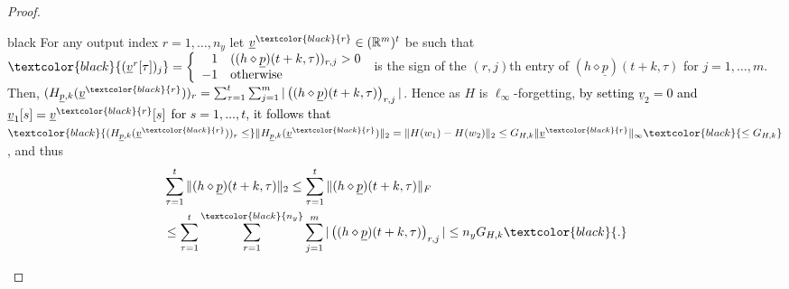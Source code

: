 \documentclass[journal,twoside,web]{ieeecolor}
\begin{document}
\begin{proof}
          \begin{color}{black}
          For any output index $r=1,\ldots,n_y$ let $\underline{v}^{\textcolor{black}{r}} \in (\mathbb{R}^m)^t$ be such that 
          $\textcolor{black}{(\underline{v}^r[\tau])_j}=\left\{\begin{array}{rl} 1 & ((h \diamond \underline{p})(t+k,\tau))_{r,j}  > 0\\ -1 & \mbox{otherwise} \end{array}\right. $ is the sign of the $(r,j)$th entry of $(h \diamond \underline{p})(t+k,\tau)$ for
          $j=1,\ldots,m$.
          Then, 
         \( (H_{\underline{p},k}(\underline{v}^{\textcolor{black}{r}}))_r=\sum_{\tau=1}^{t} \sum_{j=1}^{m} |\left((h \diamond \underline{p})(t+k,\tau)\right)_{r,j}| \).  %
           Hence 
          as $H$ is  $\ell_{\infty}$-forgetting, 
          \textcolor{black}{by setting $\underline{v}_2=0$ and $\underline{v}_1[s]=\underline{v}^{\textcolor{black}{r}}[s]$ for $s=1,\ldots,t$, it follows that} 
          $\textcolor{black}{(H_{\underline{p},k}(\underline{v}^{\textcolor{black}{r}}))_r \le} \|H_{\underline{p},k}(\underline{v}^{\textcolor{black}{r}})\|_{2}=\|H(w_1)-H(w_2)\|_2 \le G_{H,k}\|\underline{v}^{\textcolor{black}{r}}\|_{\infty} \textcolor{black}{\le G_{H,k}}$, and thus
          \begin{align*}
           & \sum_{\tau=1}^{t} \|(h \diamond \underline{p})(t+k,\tau)\|_2 \le  
           \sum_{\tau=1}^{t} \|(h \diamond \underline{p})(t+k,\tau)\|_F 
           \\
           & \le \sum_{\tau=1}^{t} \sum_{r=1}^{\textcolor{black}{n_y}} \sum_{j=1}^{m} |\left((h \diamond \underline{p})(t+k,\tau)\right)_{r,j}| \le 
         n_y G_{H,k} \textcolor{black}{.}
          \end{align*}

\end{color}
\end{proof}
\end{document}
